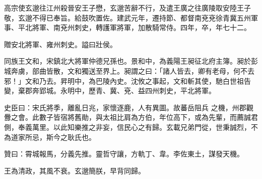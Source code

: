 \begin{pinyinscope}
 高宗使玄邈往江州殺晉安王子懋，玄邈苦辭不行，及遣王廣之往廣陵取安陸王子敬，玄邈不得已奉旨。給鼓吹置佐。建武元年，遷持節、都督南兗兗徐青冀五州軍事、平北將軍、南兗州刺史，轉護軍將軍，加散騎常侍。四年，卒，年七十二。



 贈安北將軍、雍州刺史。謚曰壯侯。



 同族王文和，宋鎮北大將軍仲德兄孫也。景和中，為義陽王昶征北府主簿。昶於彭城奔虜，部曲皆散，文和獨送至界上。昶謂之曰：「諸人皆去，卿有老母，何不去邪！」文和乃去。昇明中，為巴陵內史。沈攸之事起，文和斬其使，馳白世祖告變，棄郡奔郢城。永明中，歷青、冀、兗、益四州刺史，平北將軍。



 史臣曰：宋氏將季，離亂日兆，家懷逐鹿，人有異圖。故蕃岳阻兵
 之機，州郡觀釁之會。此數子皆宿將舊勛，與太祖比肩為方伯，年位高下，或為先輩，而薦誠君側，奉義萬里。以此知樂推之非妄，信民心之有歸。玄載兄弟門從，世秉誠烈，不為道家所忌，斯今之耿氏也。



 贊曰：霄城報馬，分義先推。靈哲守讓，方軌丁、韋。李佐東土，謀發天機。



 王為清政，其風不衰。玄邈簡朕，早背同歸。



\end{pinyinscope}